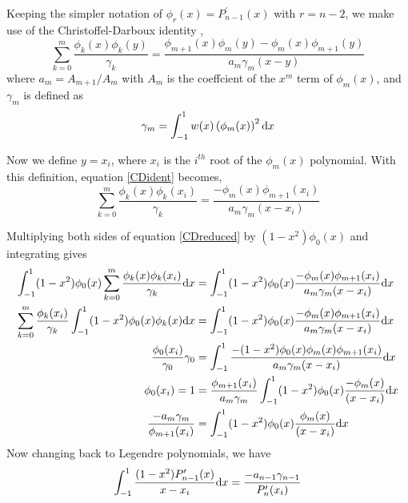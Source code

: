Keeping the simpler notation of $\phi_r(x)=P_{n-1}^\prime(x)$ with $r=n-2$, we make
use of the Christoffel-Darboux identity \cite{Hildebrand}, 
\begin{equation}
\label{CDident}
\sum_{k=0}^{m}\frac{\phi_k(x)\phi_k(y)}{\gamma_k}=\frac{\phi_{m+1}(x)\phi_m(y)-\phi_m(x)\phi_{m+1}(y)}{a_m\gamma_m(x-y)}
\end{equation}
where $a_m=A_{m+1}/A_m$ with $A_m$ is the coeffcient of the $x^m$ term of $\phi_m(x)$, and $\gamma_m$ 
is defined as \
\begin{equation}
\label{gammadef}
\gamma_m=\int_{-1}^{1} w(x)\left(\phi_m(x)\right)^2{\rm d}x
\end{equation}

Now we define $y=x_i$, where $x_i$ is the $i^{th}$ root of the $\phi_m(x)$ polynomial. 
With this definition, equation \ref{CDident} becomes, 
\begin{equation}
\label{CDreduced}
\sum_{k=0}^{m}\frac{\phi_k(x)\phi_k(x_i)}{\gamma_k}=\frac{-\phi_m(x)\phi_{m+1}(x_i)}{a_m\gamma_m(x-x_i)}
\end{equation}

Multiplying both sides of equation \ref{CDreduced} by $(1-x^2)\phi_0(x)$ and integrating gives
\begin{align}
\int_{-1}^{1} (1-x^2)\phi_0(x)\sum_{k=0}^{m}\frac{\phi_k(x)\phi_k(x_i)}{\gamma_k}{\rm d}x &= \int_{-1}^{1} (1-x^2)\phi_0(x)\frac{-\phi_m(x)\phi_{m+1}(x_i)}{a_m\gamma_m(x-x_i)}{\rm d}x \nonumber \\
\sum_{k=0}^{m}\frac{\phi_k(x_i)}{\gamma_k}\int_{-1}^{1} (1-x^2)\phi_0(x)\phi_k(x){\rm d}x &= \int_{-1}^{1} (1-x^2)\phi_0(x)\frac{-\phi_m(x)\phi_{m+1}(x_i)}{a_m\gamma_m(x-x_i)}{\rm d}x \nonumber \\
\frac{\phi_0(x_i)}{\gamma_0}\gamma_0 &= \int_{-1}^{1} \frac{-(1-x^2)\phi_0(x)\phi_m(x)\phi_{m+1}(x_i)}{a_m\gamma_m(x-x_i)}{\rm d}x \nonumber \\
\phi_0(x_i)=1 &= \frac{\phi_{m+1}(x_i)}{a_m\gamma_m}\int_{-1}^{1} (1-x^2)\phi_0(x)\frac{-\phi_m(x)}{(x-x_i)}{\rm d}x \nonumber \\
\label{CDseq}
\frac{-a_m\gamma_m}{\phi_{m+1}(x_i)} &= \int_{-1}^{1} (1-x^2)\phi_0(x)\frac{\phi_m(x)}{(x-x_i)}{\rm d}x 
\end{align}
Now changing back to Legendre polynomials, we have
\begin{equation}
\label{CDPend}
\int_{-1}^{1} \frac{(1-x^2)P_{n-1}^\prime(x)}{x-x_i}{\rm d}x = \frac{-a_{n-1}\gamma_{n-1}}{P_n^\prime(x_i)}
\end{equation}

